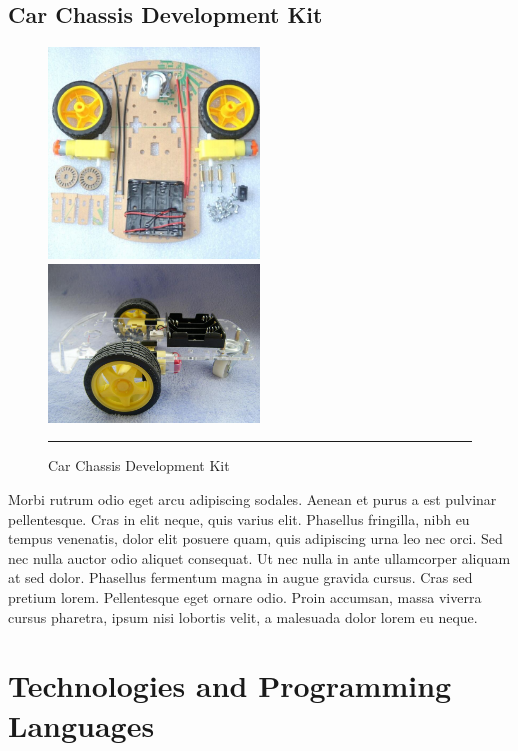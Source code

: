 \subsection{Car Chassis Development Kit}
\begin{figure}[h!]
  \centering
    \includegraphics[width=0.5\textwidth]{./Pictures/Car-Chassis-Kit.jpg}
    \includegraphics[width=0.5\textwidth]{./Pictures/Car-Chassis-Kit2.jpg}
  \rule{1\textwidth}{0.5pt}
 \caption{Car Chassis Development Kit}
\end{figure}
Morbi rutrum odio eget arcu adipiscing sodales. Aenean et purus a est pulvinar pellentesque. Cras in elit neque, quis varius elit. Phasellus fringilla, nibh eu tempus venenatis, dolor elit posuere quam, quis adipiscing urna leo nec orci. Sed nec nulla auctor odio aliquet consequat. Ut nec nulla in ante ullamcorper aliquam at sed dolor. Phasellus fermentum magna in augue gravida cursus. Cras sed pretium lorem. Pellentesque eget ornare odio. Proin accumsan, massa viverra cursus pharetra, ipsum nisi lobortis velit, a malesuada dolor lorem eu neque.



\section{Technologies and Programming Languages}

